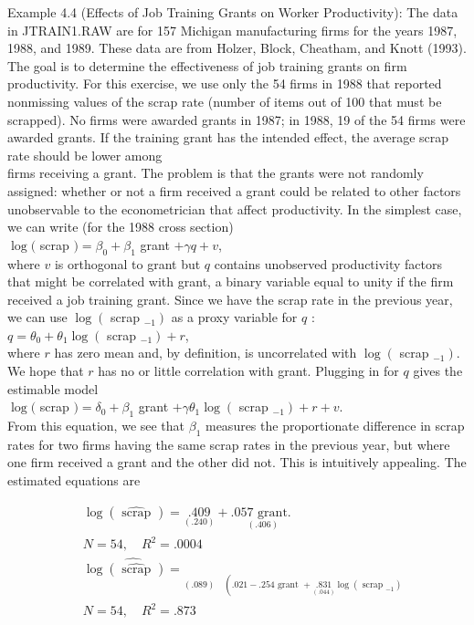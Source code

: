 \documentclass[10pt]{article}
\begin{document}
Example 4.4 (Effects of Job Training Grants on Worker Productivity): The data in JTRAIN1.RAW are for 157 Michigan manufacturing firms for the years 1987, 1988, and 1989. These data are from Holzer, Block, Cheatham, and Knott (1993). The goal is to determine the effectiveness of job training grants on firm productivity. For this exercise, we use only the 54 firms in 1988 that reported nonmissing values of the scrap rate (number of items out of 100 that must be scrapped). No firms were awarded grants in 1987; in 1988, 19 of the 54 firms were awarded grants. If the training grant has the intended effect, the average scrap rate should be lower among\\
firms receiving a grant. The problem is that the grants were not randomly assigned: whether or not a firm received a grant could be related to other factors unobservable to the econometrician that affect productivity. In the simplest case, we can write (for the 1988 cross section)\\
$\log ($ scrap $)=\beta_{0}+\beta_{1}$ grant $+\gamma q+v$,\\
where $v$ is orthogonal to grant but $q$ contains unobserved productivity factors that might be correlated with grant, a binary variable equal to unity if the firm received a job training grant. Since we have the scrap rate in the previous year, we can use $\log \left(\right.$ scrap $\left._{-1}\right)$ as a proxy variable for $q$ :\\
$q=\theta_{0}+\theta_{1} \log \left(\right.$ scrap $\left._{-1}\right)+r$,\\
where $r$ has zero mean and, by definition, is uncorrelated with $\log \left(\right.$ scrap $\left._{-1}\right)$. We hope that $r$ has no or little correlation with grant. Plugging in for $q$ gives the estimable model\\
$\log ($ scrap $)=\delta_{0}+\beta_{1}$ grant $+\gamma \theta_{1} \log \left(\right.$ scrap $\left._{-1}\right)+r+v$.\\
From this equation, we see that $\beta_{1}$ measures the proportionate difference in scrap rates for two firms having the same scrap rates in the previous year, but where one firm received a grant and the other did not. This is intuitively appealing. The estimated equations are

$$
\begin{aligned}
& \log (\widehat{\text { scrap }})=\underset{(.240)}{.409}+\underset{(.406)}{.057 \text { grant. }} \\
& N=54, \quad R^{2}=.0004 \\
& \widehat{\log (\widehat{\text { scrap }})=} \underset{(.089) \quad\left(.021-.254 \text { grant }+\underset{(.044)}{.831} \log \left(\text { scrap }_{-1}\right)\right.}{ } \\
& N=54, \quad R^{2}=.873
\end{aligned}
$$
\end{document}
